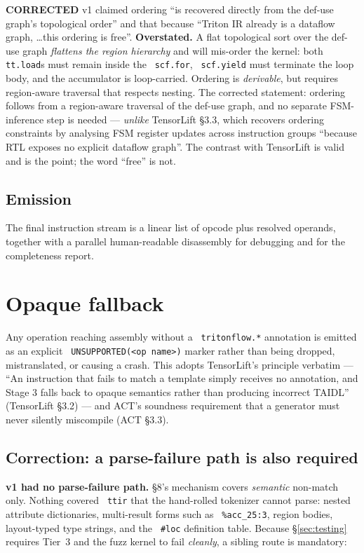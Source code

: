 \documentclass[11pt,a4paper]{article}
\newcommand{\code}[1]{\texttt{\small\hyphenchar\font=45 #1}}
\newcommand{\falsified}{\textbf{\textcolor{red!75!black}{CORRECTED}}}
\begin{document}
\falsified{} v1 claimed ordering ``is recovered directly from the def-use graph's topological order'' and
that because ``Triton IR already is a dataflow graph, \ldots this ordering is free''. \textbf{Overstated.}
A flat topological sort over the def-use graph \emph{flattens the region hierarchy} and will mis-order the
kernel: both \code{tt.load}s must remain inside the \code{scf.for}, \code{scf.yield} must terminate the loop
body, and the accumulator is loop-carried. Ordering is \emph{derivable}, but requires region-aware traversal
that respects nesting. The corrected statement: ordering follows from a region-aware traversal of the
def-use graph, and no separate FSM-inference step is needed --- \emph{unlike} TensorLift \S3.3, which
recovers ordering constraints by analysing FSM register updates across instruction groups ``because RTL
exposes no explicit dataflow graph''. The contrast with TensorLift is valid and is the point; the word
``free'' is not.

\subsection{Emission}

The final instruction stream is a linear list of opcode plus resolved operands, together with a parallel
human-readable disassembly for debugging and for the completeness report.

\section{Opaque fallback}\label{sec:fallback}

Any operation reaching assembly without a \code{tritonflow.*} annotation is emitted as an explicit
\code{UNSUPPORTED(<op name>)} marker rather than being dropped, mistranslated, or causing a crash. This
adopts TensorLift's principle verbatim --- ``An instruction that fails to match a template simply receives no
annotation, and Stage 3 falls back to opaque semantics rather than producing incorrect TAIDL'' (TensorLift
\S3.2) --- and ACT's soundness requirement that a generator must never silently miscompile (ACT \S3.3).

\subsection{Correction: a parse-failure path is also required}\label{sec:parse-fail}

\noindent\textbf{v1 had no parse-failure path.} \S8's mechanism covers \emph{semantic} non-match only.
Nothing covered \code{ttir} that the hand-rolled tokenizer cannot parse: nested attribute dictionaries,
multi-result forms such as \code{\%acc\_25:3}, region bodies, layout-typed type strings, and the \code{\#loc}
definition table. Because \S\ref{sec:testing} requires Tier~3 and the fuzz kernel to fail \emph{cleanly},
a sibling route is mandatory:
\end{document}
